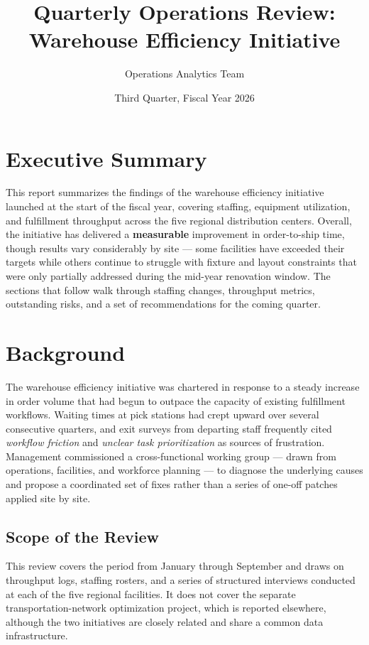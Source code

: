 \documentclass[11pt]{article}
\title{Quarterly Operations Review: Warehouse Efficiency Initiative}
\author{Operations Analytics Team}
\date{Third Quarter, Fiscal Year 2026}
\begin{document}
\maketitle
\tableofcontents

\section{Executive Summary}
This report summarizes the findings of the warehouse efficiency initiative
launched at the start of the fiscal year, covering staffing, equipment
utilization, and fulfillment throughput across the five regional
distribution centers. Overall, the initiative has delivered a
\textbf{measurable} improvement in order-to-ship time, though results vary
considerably by site --- some facilities have exceeded their targets while
others continue to struggle with fixture and layout constraints that were
only partially addressed during the mid-year renovation window. The
sections that follow walk through staffing changes, throughput metrics,
outstanding risks, and a set of recommendations for the coming quarter.

\section{Background}
The warehouse efficiency initiative was chartered in response to a steady
increase in order volume that had begun to outpace the capacity of existing
fulfillment workflows. Waiting times at pick stations had crept upward over
several consecutive quarters, and exit surveys from departing staff
frequently cited \emph{workflow friction} and \emph{unclear task
prioritization} as sources of frustration. Management commissioned a
cross-functional working group --- drawn from operations, facilities, and
workforce planning --- to diagnose the underlying causes and propose a
coordinated set of fixes rather than a series of one-off patches applied
site by site.

\subsection{Scope of the Review}
This review covers the period from January through September and draws on
throughput logs, staffing rosters, and a series of structured interviews
conducted at each of the five regional facilities. It does not cover the
separate transportation-network optimization project, which is reported
elsewhere, although the two initiatives are closely related and share a
common data infrastructure.
\end{document}
